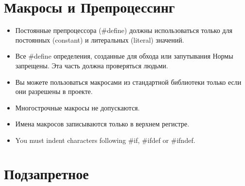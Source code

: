 \documentclass{42-ru}
\begin{document}
                
    \section{Макросы и Препроцессинг}

        \begin{itemize}

            \item Постоянные препроцессора (\#define) должны использоваться
                только для постоянных (constant) и литеральных (literal) значений.

            \item Все \#define определения, созданные для обхода или запутывания Нормы запрещены.
                Эта часть должна проверяться людьми.

            \item Вы можете пользоваться макросами из стандартной библиотеки только если они разрешены в проекте.

            \item Многострочные макросы не допускаются.

            \item Имена макросов записываются только в верхнем регистре.

            \item You must indent characters following \#if, \#ifdef
                or \#ifndef.

        \end{itemize}
        \newpage


    \section{Подзапретное}
\end{document}
